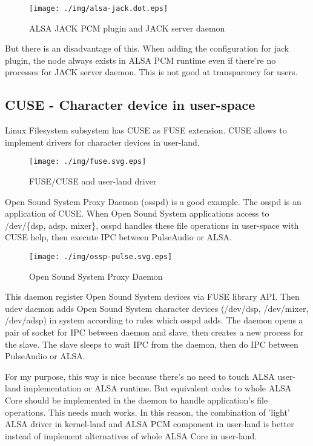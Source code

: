 \documentclass[onecolumn]{article}
\begin{document}
\begin{figure}[H]
	\centering
	\texttt{[image: ./img/alsa-jack.dot.eps]}
	\caption{{ALSA JACK PCM plugin and JACK server daemon}}
	\label{alsa_jack}
\end{figure}

But there is an disadvantage of this. When adding the configuration for jack plugin, the node always exists in ALSA PCM runtime even if there're no processes for JACK server daemon. This is not good at transparency for users.


\subsection{CUSE - Character device in user-space}
Linux Filesystem subsystem has CUSE as FUSE extension. CUSE allows to implement drivers for character devices in user-land.

\begin{figure}[H]
	\centering
	\texttt{[image: ./img/fuse.svg.eps]}
	\caption{{FUSE/CUSE and user-land driver}}
	\label{fuse}
\end{figure}

Open Sound System Proxy Daemon (osspd) is a good example. The osspd is an application of CUSE. When Open Sound System applications access to /dev/\{dsp, adsp, mixer\}, osspd handles these file operations in user-space with CUSE help, then execute IPC between PulseAudio or ALSA.

\begin{figure}[H]
	\centering
	\texttt{[image: ./img/ossp-pulse.svg.eps]}
	\caption{{Open Sound System Proxy Daemon}}
	\label{osspd_pulse}
\end{figure}


This daemon register Open Sound System devices via FUSE library API. Then udev daemon adds Open Sound System character devices (/dev/dsp, /dev/mixer, /dev/adsp) in system according to rules which osspd adds. The daemon opens a pair of socket for IPC between daemon and slave, then creates a new process for the slave. The slave sleeps to wait IPC from the daemon, then do IPC between PulseAudio or ALSA.

For my purpose, this way is nice because there's no need to touch ALSA user-land implementation or ALSA runtime. But equivalent codes to whole ALSA Core should be implemented in the daemon to handle application's file operations. This needs much works. In this reason, the combination of 'light' ALSA driver in kernel-land and ALSA PCM component in user-land is better instead of implement alternatives of whole ALSA Core in user-land.
\end{document}
